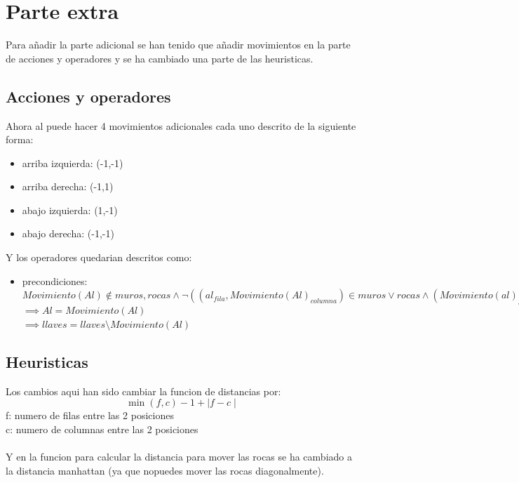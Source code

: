 \documentclass[11pt,spanish]{article}
\begin{document}
	\section{Parte extra}
	Para añadir la parte adicional se han tenido que añadir movimientos en la parte de acciones y operadores y se ha cambiado una parte de las heuristicas.
		\subsection{Acciones y operadores}
			Ahora al puede hacer 4 movimientos adicionales cada uno descrito de la siguiente forma:
			\begin{itemize}
				\item arriba izquierda: (-1,-1)
				\item arriba derecha: (-1,1)
				\item abajo izquierda: (1,-1)
				\item abajo derecha: (-1,-1)
			\end{itemize}
			Y los operadores quedarian descritos como:
			\begin{itemize}
				\item precondiciones: $Movimiento(Al) \notin muros, rocas \land \neg((al_{fila},Movimiento(Al)_{columna}) \in muros \lor rocas  \land (Movimiento(al)_{fila},Al_{columna}) \in muros \lor rocas)\lor (llaves = \emptyset \land Movimiento(Al) = salida)$\\
				$\implies Al = Movimiento(Al)$\\
				$\implies llaves = llaves\setminus Movimiento(Al)$
			\end{itemize}
		\subsection{Heuristicas}
			Los cambios aqui han sido cambiar la funcion de distancias por:\\
			$$\min(f,c)-1 + \mid f-c\mid$$
			f: numero de filas entre las 2 posiciones\\
			c: numero de columnas entre las 2 posiciones\\
			\\
			Y en la funcion para calcular la distancia para mover las rocas se ha cambiado a la distancia manhattan (ya que nopuedes mover las rocas diagonalmente).\\
\end{document}
